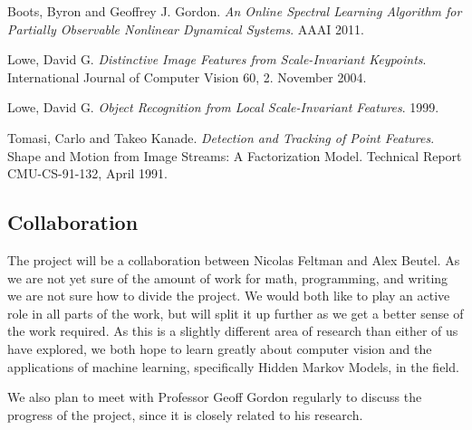 \documentclass{article}
\begin{document}


	\begin{thebibliography}{9}

			Boots, Byron and Geoffrey J. Gordon.
			\emph{An Online Spectral Learning Algorithm for Partially Observable Nonlinear Dynamical Systems}.
			AAAI 2011.

			Lowe, David G.
			\emph{Distinctive Image Features from Scale-Invariant Keypoints}.
			International Journal of Computer Vision 60, 2. November 2004.

			Lowe, David G.
			\emph{Object Recognition from Local Scale-Invariant Features}.
			1999.

			Tomasi, Carlo and Takeo Kanade.
			\emph{Detection and Tracking of Point Features}.
			Shape and Motion from Image Streams: A Factorization Model.
			Technical Report CMU-CS-91-132,
			April 1991.

	\end{thebibliography}
	

	\subsection*{Collaboration} %
	\label{sub:Collaboration}

	The project will be a collaboration between Nicolas Feltman and Alex
	Beutel.  As we are not yet sure of the amount of work for math,
	programming, and writing we are not sure how to divide the project.  We
	would both like to play an active role in all parts of the work, but will
	split it up further as we get a better sense of the work required.  As this
	is a slightly different area of research than either of us have explored,
	we both hope to learn greatly about computer vision and the applications of
	machine learning, specifically Hidden Markov Models, in the field.

	We also plan to meet with Professor Geoff Gordon regularly to discuss the
	progress of the project, since it is closely related to his research.
	

	
\end{document}
